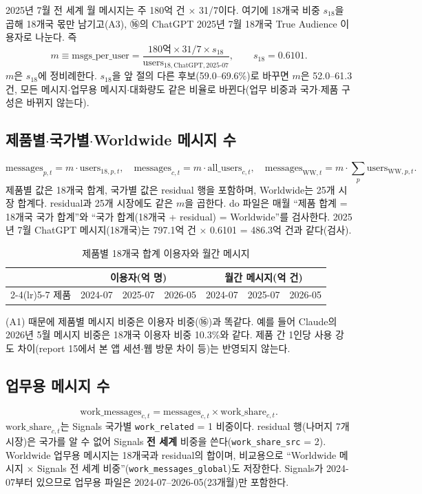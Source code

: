 \documentclass[11pt]{article}
\begin{document}
2025년 7월 전 세계 월 메시지는 주 180억 건 $\times$ 31/7이다. 여기에 18개국 비중 $s_{18}$을 곱해 18개국 몫만 남기고(A3), ⑯의 ChatGPT 2025년 7월 18개국 True Audience 이용자로 나눈다. 즉
\[
  m \equiv \text{msgs\_per\_user} = \frac{180\text{억} \times 31/7 \times s_{18}}{\text{users}_{18,\text{ChatGPT},2025\text{-}07}}, \qquad s_{18} = 0.6101 .
\]
$m$은 $s_{18}$에 정비례한다. $s_{18}$을 앞 절의 다른 후보(59.0--69.6\%)로 바꾸면 $m$은 52.0--61.3건, 모든 메시지$\cdot$업무용 메시지$\cdot$대화량도 같은 비율로 바뀐다(업무 비중과 국가$\cdot$제품 구성은 바뀌지 않는다).

\subsection{제품별$\cdot$국가별$\cdot$Worldwide 메시지 수}
\[
  \text{messages}_{p,t} = m \cdot \text{users}_{18,p,t}, \quad
  \text{messages}_{c,t} = m \cdot \text{all\_users}_{c,t}, \quad
  \text{messages}_{\text{WW},t} = m \cdot \textstyle\sum_p \text{users}_{\text{WW},p,t} .
\]
제품별 값은 18개국 합계, 국가별 값은 residual 행을 포함하며, Worldwide는 25개 시장 합계다. residual과 25개 시장에도 같은 $m$을 곱한다. do 파일은 매월 ``제품 합계 = 18개국 국가 합계''와 ``국가 합계(18개국 + residual) = Worldwide''를 검사한다. 2025년 7월 ChatGPT 메시지(18개국)는 797.1억 건 $\times$ 0.6101 = 486.3억 건과 같다(검사).

\begin{table}[h]
\centering
\caption{제품별 18개국 합계 이용자와 월간 메시지}\label{tab:products}
\begin{tabular}{lrrrrrr}
\toprule
 & \multicolumn{3}{c}{이용자(억 명)} & \multicolumn{3}{c}{월간 메시지(억 건)} \\
\cmidrule(lr){2-4}\cmidrule(lr){5-7}
제품 & 2024-07 & 2025-07 & 2026-05 & 2024-07 & 2025-07 & 2026-05 \\
\midrule

\bottomrule
\end{tabular}
\end{table}

(A1) 때문에 제품별 메시지 비중은 이용자 비중(⑯)과 똑같다. 예를 들어 Claude의 2026년 5월 메시지 비중은 18개국 이용자 비중 10.3\%와 같다. 제품 간 1인당 사용 강도 차이(report 15에서 본 앱 세션$\cdot$웹 방문 차이 등)는 반영되지 않는다.

\subsection{업무용 메시지 수}
\[
  \text{work\_messages}_{c,t} = \text{messages}_{c,t} \times \text{work\_share}_{c,t} .
\]
$\text{work\_share}_{c,t}$는 Signals 국가별 \texttt{work\_related} = 1 비중이다. residual 행(나머지 7개 시장)은 국가를 알 수 없어 Signals \textbf{전 세계} 비중을 쓴다(\texttt{work\_share\_src} = 2). Worldwide 업무용 메시지는 18개국과 residual의 합이며, 비교용으로 ``Worldwide 메시지 $\times$ Signals 전 세계 비중''(\texttt{work\_messages\_global})도 저장한다. Signals가 2024-07부터 있으므로 업무용 파일은 2024-07--2026-05(23개월)만 포함한다.
\end{document}

